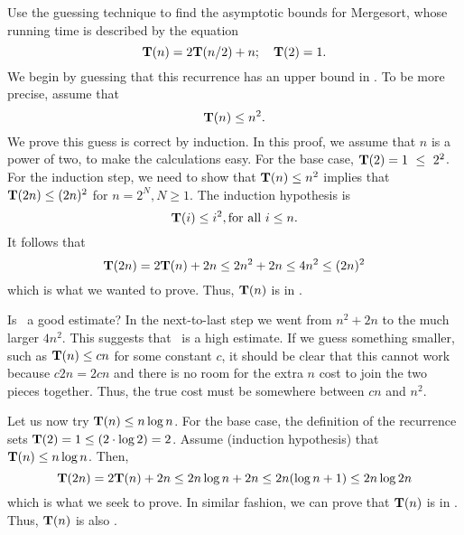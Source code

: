 \begin{example}
Use the guessing technique to find the asymptotic bounds for
Mergesort, whose running time is described by the equation
\[{\bf T}(n) = 2{\bf T}(n/2) + n; \quad {\bf T}(2) = 1.\]
\noindent We begin by guessing that this recurrence has an upper
bound in \Ontwo.
To be more precise, assume that
\[{\bf T}(n) \leq n^2.\]
\noindent We prove this guess is correct by induction.
In this proof, we assume that \(n\) is a
power of two, to make the calculations easy.
For the base case, \({\bf T}(2) = 1~\leq~2^2\).
For the induction step, we need to show that \({\bf T}(n) \leq n^2\)
implies that \({\bf T}(2n) \leq (2n)^2\) for \(n = 2^N, N \geq 1\).
The induction hypothesis is
\[{\bf T}(i) \leq i^2, {\rm for~all}~i \leq n.\]
\noindent It follows that
\[{\bf T}(2n) = 2{\bf T}(n) + 2n \leq 2n^2 + 2n \leq 4n^2 \leq (2n)^2\]
\noindent which is what we wanted to prove.
Thus, \({\bf T}(n)\) is in \Ontwo.

Is \Ontwo\ a good estimate?
In the next-to-last step we went from \(n^2 + 2n\) to the much larger
\(4n^2\).
This suggests that \Ontwo\ is a high estimate.
If we guess something smaller, such as \({\bf T}(n) \leq cn\) for
some constant \(c\), it should be clear that this cannot work because
\(c 2 n = 2 c n\) and there is no room for the extra \(n\) cost to join
the two pieces together.
Thus, the true cost must be somewhere between \(cn\) and \(n^2\).

Let us now try \({\bf T}(n) \leq n \log n\).
For the base case, the definition of the recurrence sets
\({\bf T}(2) = 1 \leq (2 \cdot \log 2) = 2\).
Assume (induction hypothesis) that \({\bf T}(n) \leq n \log n\).
Then,
\[{\bf T}(2n) = 2{\bf T}(n) + 2n \leq 2n \log n + 2n
\leq 2n(\log n + 1) \leq 2 n \log 2n\]
\noindent which is what we seek to prove.
In similar fashion, we can prove that \({\bf T}(n)\) is in \Omeganlogn.
Thus, \({\bf T}(n)\) is also \Thetanlogn.
\end{example}

